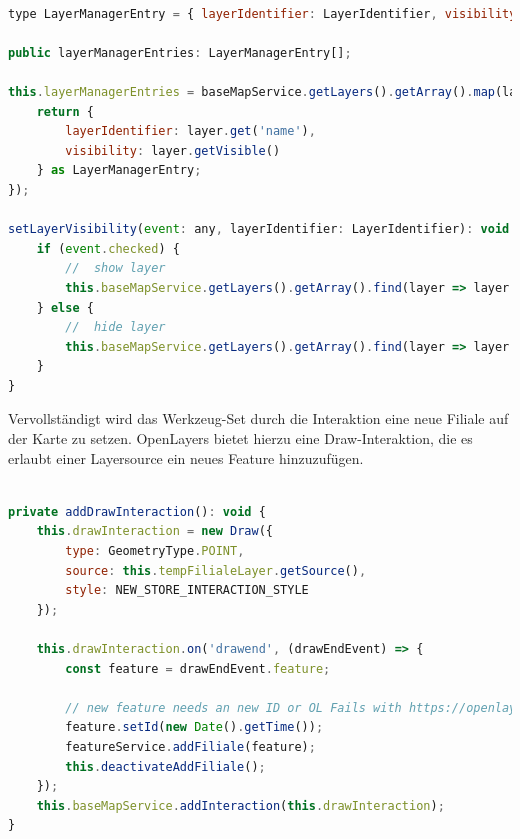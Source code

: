 \begin{lstlisting}[language=JavaScript, caption={Layermanager}]
	
type LayerManagerEntry = { layerIdentifier: LayerIdentifier, visibility: boolean };

public layerManagerEntries: LayerManagerEntry[];

this.layerManagerEntries = baseMapService.getLayers().getArray().map(layer => {
	return {
		layerIdentifier: layer.get('name'),
		visibility: layer.getVisible()
	} as LayerManagerEntry;
});

setLayerVisibility(event: any, layerIdentifier: LayerIdentifier): void {
	if (event.checked) {
		//  show layer
		this.baseMapService.getLayers().getArray().find(layer => layer.get('name') === layerIdentifier).setVisible(true);
	} else {
		//  hide layer
		this.baseMapService.getLayers().getArray().find(layer => layer.get('name') === layerIdentifier).setVisible(false);
	}
}
\end{lstlisting}

Vervollständigt wird das Werkzeug-Set durch die Interaktion eine neue Filiale auf der Karte zu setzen.
OpenLayers bietet hierzu eine Draw-Interaktion, die es erlaubt einer Layersource ein neues Feature hinzuzufügen.

\begin{lstlisting}[language=JavaScript, caption={Draw-Interaktion}]

private addDrawInteraction(): void {
	this.drawInteraction = new Draw({
		type: GeometryType.POINT,
		source: this.tempFilialeLayer.getSource(),
		style: NEW_STORE_INTERACTION_STYLE
	});
	
	this.drawInteraction.on('drawend', (drawEndEvent) => {
		const feature = drawEndEvent.feature;
		
		// new feature needs an new ID or OL Fails with https://openlayers.org/en/v6.3.1/doc/errors/#30
		feature.setId(new Date().getTime());
		featureService.addFiliale(feature);
		this.deactivateAddFiliale();
	});
	this.baseMapService.addInteraction(this.drawInteraction);
}
\end{lstlisting}

